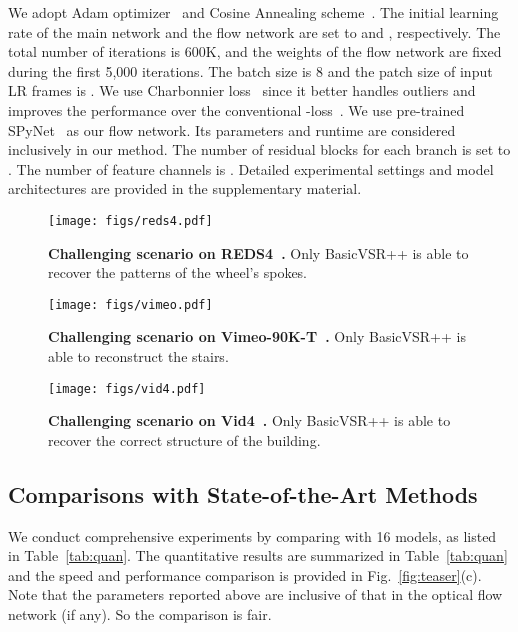 \documentclass[10pt,twocolumn,letterpaper]{article}
\begin{document}
We adopt Adam optimizer~\cite{kingma2014adam} and Cosine Annealing scheme~\cite{loshchilov2016sgdr}. The initial learning rate of the main network and the flow network are set to  and , respectively. The total number of iterations is 600K, and the weights of the flow network are fixed during the first 5,000 iterations. The batch size is 8 and the patch size of input LR frames is . We use Charbonnier loss~\cite{charbonnier1994two} since it better handles outliers and improves the performance over the conventional -loss~\cite{lai2017deep}.
We use pre-trained SPyNet~\cite{ranjan2017optical} as our flow network. Its parameters and runtime are considered inclusively in our method. The number of residual blocks for each branch is set to . The number of feature channels is . Detailed experimental settings and model architectures are provided in the supplementary material.

\begin{figure*}[!t]
    \begin{center}
        \texttt{[image: figs/reds4.pdf]}
        \vskip -0.35cm
        \caption{\textbf{Challenging scenario on REDS4~\cite{wang2019edvr}.} Only BasicVSR++ is able to recover the patterns of the wheel's spokes.}
        \label{fig:reds4}
    \end{center}
    \vspace{-0.2cm}
\end{figure*}
\begin{figure*}[!t]
    \begin{center}
        \texttt{[image: figs/vimeo.pdf]}
        \vskip -0.35cm
        \caption{\textbf{Challenging scenario on Vimeo-90K-T~\cite{xue2019video}.} Only BasicVSR++ is able to reconstruct the stairs.}
        \label{fig:vimeo}
    \end{center}
    \vspace{-0.2cm}
\end{figure*}
\begin{figure*}[!t]
    \begin{center}
        \texttt{[image: figs/vid4.pdf]}
        \vskip -0.35cm
        \caption{\textbf{Challenging scenario on Vid4~\cite{liu2014bayesian}.} Only BasicVSR++ is able to recover the correct structure of the building.}
        \label{fig:vid4}
    \end{center}
    \vspace{-0.35cm}
\end{figure*}
\subsection{Comparisons with State-of-the-Art Methods}
We conduct comprehensive experiments by comparing with 16 models, as listed in Table~\ref{tab:quan}.
The quantitative results are summarized in Table~\ref{tab:quan} and the speed and performance comparison is provided in Fig.~\ref{fig:teaser}(c). Note that the parameters reported above are inclusive of that in the optical flow network (if any). So the comparison is fair.
\end{document}

